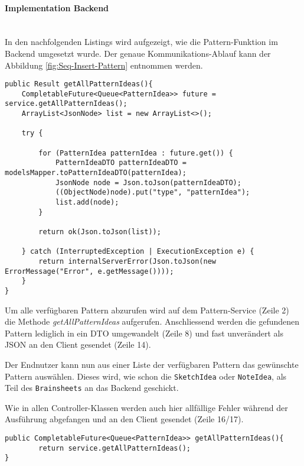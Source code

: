 \paragraph*{Implementation Backend}~\\
In den nachfolgenden Listings wird aufgezeigt, wie die Pattern-Funktion im Backend umgesetzt wurde.
Der genaue Kommunikations-Ablauf kann der Abbildung \ref{fig:Seq-Insert-Pattern} entnommen werden.

\begin{lstlisting}[caption={Alle Pattern holen im Pattern Controller}, label=getAllPatternInController]
 public Result getAllPatternIdeas(){
    CompletableFuture<Queue<PatternIdea>> future = service.getAllPatternIdeas();
    ArrayList<JsonNode> list = new ArrayList<>();

    try {

        for (PatternIdea patternIdea : future.get()) {
            PatternIdeaDTO patternIdeaDTO = modelsMapper.toPatternIdeaDTO(patternIdea);
            JsonNode node = Json.toJson(patternIdeaDTO);
            ((ObjectNode)node).put("type", "patternIdea");
            list.add(node);
        }

        return ok(Json.toJson(list));

    } catch (InterruptedException | ExecutionException e) {
        return internalServerError(Json.toJson(new ErrorMessage("Error", e.getMessage())));
    }
}
\end{lstlisting}

Um alle verfügbaren Pattern abzurufen wird auf dem Pattern-Service (Zeile 2) die Methode \textit{getAllPatternIdeas} aufgerufen. Anschliessend werden die gefundenen Pattern lediglich in ein DTO umgewandelt (Zeile 8) und fast unverändert als JSON an den Client gesendet (Zeile 14).

Der Endnutzer kann nun aus einer Liste der verfügbaren Pattern das gewünschte Pattern auswählen. Dieses wird, wie schon die \texttt{SketchIdea} oder \texttt{NoteIdea}, als Teil des \texttt{Brainsheets} an das Backend geschickt. 

Wie in allen Controller-Klassen werden auch hier allfällige Fehler während der Ausführung abgefangen und an den Client gesendet (Zeile 16/17).

\begin{lstlisting}[caption={Alle Pattern holen im Pattern Service}, label=getAllPatternInService]
public CompletableFuture<Queue<PatternIdea>> getAllPatternIdeas(){
        return service.getAllPatternIdeas();
}
\end{lstlisting}


